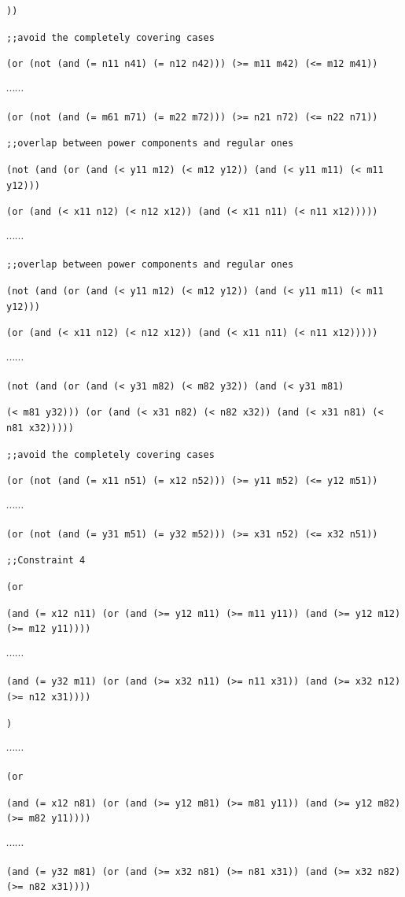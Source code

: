 \documentclass[11pt]{article}
\begin{document}
{{{\tt ))}

{\tt ;;avoid the completely covering cases}

{\tt (or (not (and (= n11 n41) (= n12 n42))) (>= m11 m42) (<= m12 m41))}

$\cdots \cdots$

{\tt (or (not (and (= m61 m71) (= m22 m72))) (>= n21 n72) (<= n22 n71))}

{\tt ;;overlap between power components and regular ones}

{\tt (not (and (or (and (< y11 m12) (< m12 y12)) (and (< y11 m11) (< m11 y12)))}

{\tt (or (and (< x11 n12) (< n12 x12)) (and (< x11 n11) (< n11 x12)))))}

$\cdots \cdots$

{\tt ;;overlap between power components and regular ones}

{\tt (not (and (or (and (< y11 m12) (< m12 y12)) (and (< y11 m11) (< m11 y12)))}

{\tt (or (and (< x11 n12) (< n12 x12)) (and (< x11 n11) (< n11 x12)))))

$\cdots \cdots$

{\tt (not (and (or (and (< y31 m82) (< m82 y32)) (and (< y31 m81)}

{\tt (< m81 y32))) (or (and (< x31 n82) (< n82 x32)) (and (< x31 n81) (< n81 x32)))))}

{\tt ;;avoid the completely covering cases}

{\tt (or (not (and (= x11 n51) (= x12 n52))) (>= y11 m52) (<= y12 m51))}

$\cdots \cdots$

{\tt (or (not (and (= y31 m51) (= y32 m52))) (>= x31 n52) (<= x32 n51))}

{\tt ;;Constraint 4}

{\tt (or}

{\tt (and (= x12 n11) (or (and (>= y12 m11) (>= m11 y11)) (and (>= y12 m12) (>= m12 y11))))}

$\cdots \cdots$

{\tt (and (= y32 m11) (or (and (>= x32 n11) (>= n11 x31)) (and (>= x32 n12) (>= n12 x31))))}

{\tt )}

$\cdots \cdots$

{\tt (or}

{\tt (and (= x12 n81) (or (and (>= y12 m81) (>= m81 y11)) (and (>= y12 m82) (>= m82 y11))))}

$\cdots \cdots$

{\tt (and (= y32 m81) (or (and (>= x32 n81) (>= n81 x31)) (and (>= x32 n82) (>= n82 x31))))}

}}}
\end{document}
